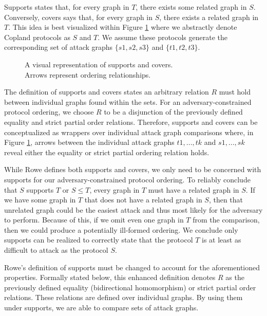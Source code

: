 \documentclass[runningheads]{llncs}
\theoremstyle{definition}
\begin{document}
Supports states that, for every graph in $T$, there exists some related graph in $S$. Conversely, covers says that, for every graph in $S$, there exists a related graph in $T$.  This idea is best visualized within Figure \ref{fig:sup-cov} where we abstractly denote Copland protocols as $S$ and $T$. We assume these protocols generate the corresponding set of attack graphs $\{s1, s2 , s3 \}$ and $ \{t1, t2 ,t3\}$.

\begin{figure}[htbp]
    \centering
    
    \captionsetup{justification=centering,margin=1cm}
    \caption[Supports and covers]{A visual representation of supports and covers. \\ Arrows represent ordering relationships.}
    \label{fig:sup-cov}
\end{figure}

The definition of supports and covers states an arbitrary relation $R$ must hold between individual graphs found within the sets. For an adversary-constrained protocol ordering, we choose $R$ to be a disjunction of the previously defined equality and strict partial order relations. Therefore, supports and covers can be conceptualized as wrappers over individual attack graph comparisons where, in Figure \ref{fig:sup-cov}, arrows between the individual attack graphs $t1, ... ,tk$ and $s1, ... ,sk$ reveal either the equality or strict partial ordering relation holds. 

While Rowe defines both supports and covers, we only need to be concerned with supports for our adversary-constrained protocol ordering. To reliably conclude that $S$ supports $T$ or $S \leq T$, every graph in $T$ must have a related graph in $S$. If we have some graph in $T$ that does not have a related graph in $S$, then that unrelated graph could be the easiest attack and thus most likely for the adversary to perform. Because of this, if we omit even one graph in $T$ from the comparison, then we could produce a potentially ill-formed ordering. We conclude only supports can be realized to correctly state that the protocol $T$ is at least as difficult to attack as the protocol $S$. 

Rowe's \cite{Rowe:2021:OnOrdering} definition of supports must be changed to account for the aforementioned properties. Formally stated below, this enhanced definition denotes $R$ as the previously defined equality (bidirectional homomorphism) or strict partial order relations. These relations are defined over individual graphs. By using them under supports, we are able to compare sets of attack graphs. 
\end{document}
